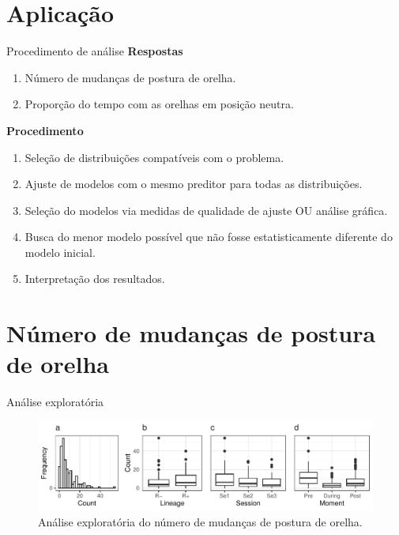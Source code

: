 \documentclass[
  ignorenonframetext,
  serif,
  professionalfont,
  usenames,
  dvipsnames,
  aspectratio = 169]{beamer}
\providecommand{\tightlist}{%
  \setlength{\itemsep}{0pt}\setlength{\parskip}{0pt}}
\renewcommand{\tightlist}{%
  \setlength{\itemsep}{0\baselineskip}
  \setlength{\parskip}{0.25\baselineskip}
}
\begin{document}
\hypertarget{aplicauxe7uxe3o}{%
\section{Aplicação}\label{aplicauxe7uxe3o}}

\begin{frame}{Procedimento de análise}
\protect\hypertarget{procedimento-de-anuxe1lise}{}
\textbf{Respostas}

\begin{enumerate}
\tightlist
\item
  Número de mudanças de postura de orelha.
\item
  Proporção do tempo com as orelhas em posição neutra.
\end{enumerate}

\textbf{Procedimento}

\begin{enumerate}
\tightlist
\item
  Seleção de distribuições compatíveis com o problema.
\item
  Ajuste de modelos com o mesmo preditor para todas as distribuições.
\item
  Seleção do modelos via medidas de qualidade de ajuste OU análise
  gráfica.
\item
  Busca do menor modelo possível que não fosse estatisticamente
  diferente do modelo inicial.
\item
  Interpretação dos resultados.
\end{enumerate}
\end{frame}

\hypertarget{nuxfamero-de-mudanuxe7as-de-postura-de-orelha}{%
\section{Número de mudanças de postura de
orelha}\label{nuxfamero-de-mudanuxe7as-de-postura-de-orelha}}

\begin{frame}{Análise exploratória}
\protect\hypertarget{anuxe1lise-exploratuxf3ria}{}
\begin{figure}

{\centering \includegraphics[width=0.95\linewidth]{./img/count} 

}

\caption{Análise exploratória do número de mudanças de postura de orelha.}\label{fig:unnamed-chunk-10}
\end{figure}
\end{frame}
\end{document}
